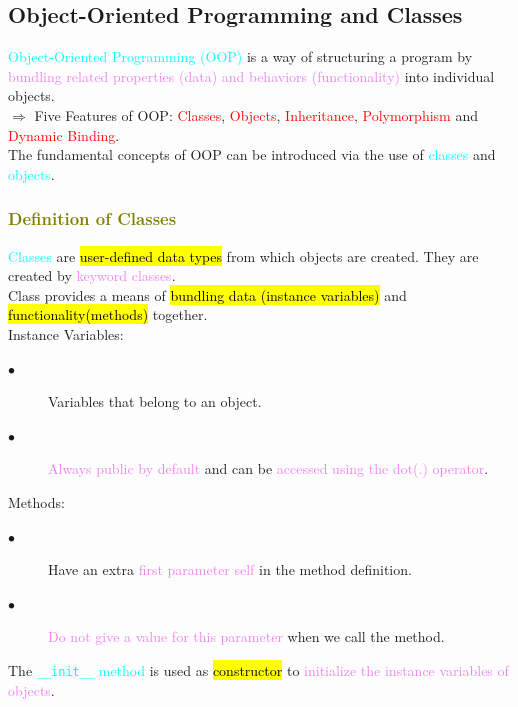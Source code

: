 \documentclass{book}
\begin{document}
    \subsection{Object-Oriented Programming and Classes}
    \textcolor{cyan}{Object-Oriented Programming (OOP)} is a way of structuring a program by \textcolor{violet}{bundling related properties (data) and behaviors (functionality)} into individual objects. \\
    $\Rightarrow$ Five Features of OOP: \textcolor{red}{Classes}, \textcolor{red}{Objects}, \textcolor{red}{Inheritance}, \textcolor{red}{Polymorphism} and \textcolor{red}{Dynamic Binding}.\\
    The fundamental concepts of OOP can be introduced via the use of \textcolor{cyan}{classes} and \textcolor{cyan}{objects}.
    \newpage
    \textcolor{olive}{\subsubsection{Definition of Classes}}
    \textcolor{cyan}{Classes} are \hl{user-defined data types} from which objects are created. They are created by \textcolor{violet}{keyword classes}.\\
    Class provides a means of \hl{bundling data (instance variables)} and \hl{functionality(methods)} together.\\
    Instance Variables:
    \begin{description}
        \item[$\bullet$] Variables that belong to an object.
        \item[$\bullet$] \textcolor{violet}{Always public by default} and can be \textcolor{violet}{accessed using the dot(.) operator}.
    \end{description}
    Methods:
    \begin{description}
        \item[$\bullet$] Have an extra \textcolor{violet}{first parameter self} in the method definition.
        \item[$\bullet$] \textcolor{violet}{Do not give a value for this parameter} when we call the method.
    \end{description}
    The \textcolor{cyan}{\texttt{\_\_init\_\_} method} is used as \hl{constructor} to \textcolor{violet}{initialize the instance variables of objects}.
\end{document}
